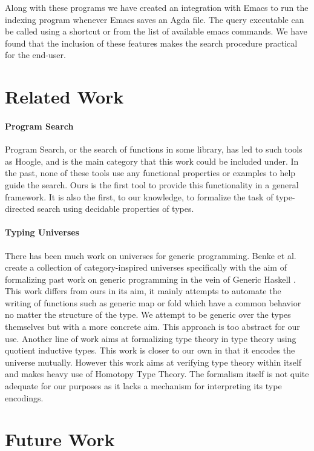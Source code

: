 \documentclass[acmsmall,review,authorversion]{acmart}
\newcommand{\?}{\stackrel{?}{\approx}}
\begin{document}
Along with these programs we have created an integration with Emacs to run the
indexing program whenever Emacs saves an Agda file. The query executable can be
called using a shortcut or from the list of available emacs commands. We have
found that the inclusion of these features makes the search procedure practical
for the end-user.

\section{Related Work}

\paragraph{Program Search} Program Search, or the search of functions in some
library, has led to such tools as Hoogle, and is the main category that this
work could be included under. In the past, none of these tools use any
functional properties or examples to help guide the search. Ours is the first
tool to provide this functionality in a general framework. It is also the first,
to our knowledge, to formalize the task of type-directed search using decidable
properties of types.

\paragraph{Typing Universes} There has been much work on universes for generic
programming. Benke et al. create a collection of category-inspired universes
specifically with the aim of formalizing past work on generic programming in the
vein of Generic Haskell \cite{benke2003universes}. This work differs from ours
in its aim, it mainly attempts to automate the writing of functions such as
generic map or fold which have a common behavior no matter the structure of the
type. We attempt to be generic over the types themselves but with a more
concrete aim. This approach is too abstract for our use. Another line of work
aims at formalizing type theory in type theory using quotient inductive
types\cite{altenkirch2016type}. This work is closer to our own in that it
encodes the universe mutually. However this work aims at verifying type theory
within itself and makes heavy use of Homotopy Type Theory\cite{HoTT}. The
formalism itself is not quite adequate for our purposes as it lacks a mechanism
for interpreting its type encodings.

\section{Future Work}
\end{document}
